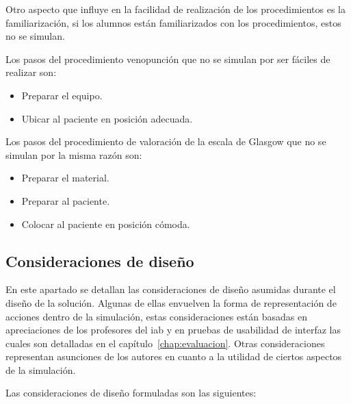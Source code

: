 \begin{itemize}
    Otro aspecto que influye en la facilidad de realización de los
    procedimientos es la familiarización, si los alumnos están familiarizados
    con los procedimientos, estos no se simulan.
        
    Los pasos del procedimiento venopunción que no se simulan por
    ser fáciles de realizar son:
        
    \begin{itemize}
        \item Preparar el equipo.
        \item Ubicar al paciente en posición adecuada.
    \end{itemize}
    
    Los pasos del procedimiento de valoración de la escala de Glasgow 
    que no se simulan por la misma razón son:
    \begin{itemize}
    \item Preparar el material.
    \item Preparar al paciente.
    \item Colocar al paciente en posición cómoda.
    \end{itemize}
        
\end{itemize}

\subsection{Consideraciones de diseño}
\label{sec:hipotesis}

En este apartado se detallan las consideraciones de diseño asumidas durante el diseño de 
la solución. Algunas de ellas envuelven la forma de representación de acciones 
dentro de la simulación, estas consideraciones están  basadas en apreciaciones de los 
profesores del \Gls{iab} y en pruebas de usabilidad de interfaz las cuales son 
detalladas en el capítulo~\ref{chap:evaluacion}. Otras consideraciones representan 
asunciones de los autores 
en cuanto a la utilidad de ciertos aspectos de la simulación.

Las consideraciones de diseño formuladas son las siguientes:

